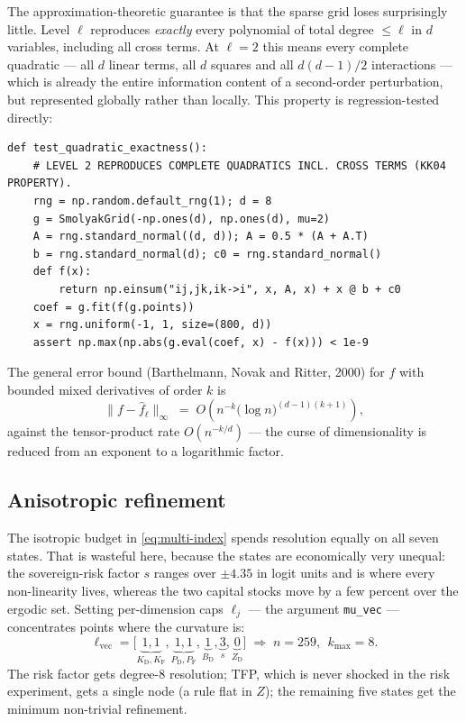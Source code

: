 \documentclass[11pt]{article}
\numberwithin{equation}{section}
\newcommand{\code}[1]{\texttt{\small #1}}
\newcommand{\D}{\mathrm{D}}
\newcommand{\F}{\mathrm{F}}
\theoremstyle{definition}
\theoremstyle{plain}
\theoremstyle{remark}
\begin{document}
The approximation-theoretic guarantee is that the sparse grid loses surprisingly
little. Level $\ell$ reproduces \emph{exactly} every polynomial of total degree
$\le\ell$ in $d$ variables, including all cross terms. At $\ell=2$ this means every
complete quadratic --- all $d$ linear terms, all $d$ squares and all $d(d-1)/2$
interactions --- which is already the entire information content of a second-order
perturbation, but represented globally rather than locally. This property is
regression-tested directly:

\begin{lstlisting}[caption={The exactness property, tested. \code{tests/test\_state\_grid.py}.}]
def test_quadratic_exactness():
    # LEVEL 2 REPRODUCES COMPLETE QUADRATICS INCL. CROSS TERMS (KK04 PROPERTY).
    rng = np.random.default_rng(1); d = 8
    g = SmolyakGrid(-np.ones(d), np.ones(d), mu=2)
    A = rng.standard_normal((d, d)); A = 0.5 * (A + A.T)
    b = rng.standard_normal(d); c0 = rng.standard_normal()
    def f(x):
        return np.einsum("ij,jk,ik->i", x, A, x) + x @ b + c0
    coef = g.fit(f(g.points))
    x = rng.uniform(-1, 1, size=(800, d))
    assert np.max(np.abs(g.eval(coef, x) - f(x))) < 1e-9
\end{lstlisting}

The general error bound (Barthelmann, Novak and Ritter, 2000) for $f$ with bounded
mixed derivatives of order $k$ is
\begin{equation}
\bigl\|f-\hat f_{\ell}\bigr\|_{\infty}
\;=\;O\!\left(n^{-k}\bigl(\log n\bigr)^{(d-1)(k+1)}\right),
\label{eq:smolyak-error}
\end{equation}
against the tensor-product rate $O(n^{-k/d})$ --- the curse of dimensionality is
reduced from an exponent to a logarithmic factor.

\subsection{Anisotropic refinement}
\label{sec:anisotropic}

The isotropic budget in \eqref{eq:multi-index} spends resolution equally on all seven
states. That is wasteful here, because the states are economically very unequal: the
sovereign-risk factor $s$ ranges over $\pm4.35$ in logit units and is where every
non-linearity lives, whereas the two capital stocks move by a few percent over the
ergodic set. Setting per-dimension caps $\ell_j$ --- the argument \code{mu\_vec} ---
concentrates points where the curvature is:
\begin{equation}
\ell_{\text{vec}}=\bigl[\underbrace{1,1}_{K_\D,K_\F},
\underbrace{1,1}_{P_\D,P_\F},\underbrace{1}_{B_\D},
\underbrace{3}_{s},\underbrace{0}_{Z_\D}\bigr]
\;\Longrightarrow\; n=259,\ \ k_{\max}=8 .
\label{eq:mu-vec}
\end{equation}
The risk factor gets degree-8 resolution; TFP, which is never shocked in the risk
experiment, gets a single node (a rule flat in $Z$); the remaining five states get
the minimum non-trivial refinement.
\end{document}
